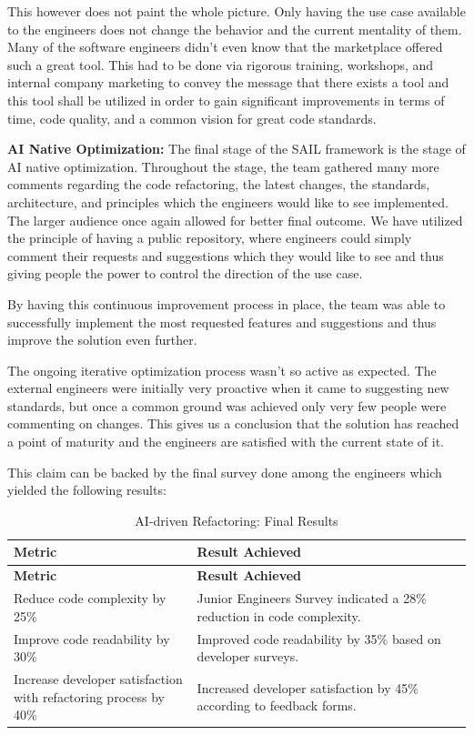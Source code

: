 \documentclass[]{imc-inf}
\begin{document}
This however does not paint the whole picture. Only having the use case available to the engineers does not change the behavior and the current mentality of them. Many of the software engineers didn't even know that the marketplace offered such a great tool. This had to be done via rigorous training, workshops, and internal company marketing to convey the message that there exists a tool and this tool shall be utilized in order to gain significant improvements in terms of time, code quality, and a common vision for great code standards. 


\textbf{AI Native Optimization:}
The final stage of the SAIL framework is the stage of AI native optimization. Throughout the stage, the team gathered many more comments regarding the code refactoring, the latest changes, the standards, architecture, and principles which the engineers would like to see implemented. The larger audience once again allowed for better final outcome. We have utilized the principle of having a public repository, where engineers could simply comment their requests and suggestions which they would like to see and thus giving people the power to control the direction of the use case.

By having this continuous improvement process in place, the team was able to successfully implement the most requested features and suggestions and thus improve the solution even further.

The ongoing iterative optimization process wasn't so active as expected. The external engineers were initially very proactive when it came to suggesting new standards, but once a common ground was achieved only very few people were commenting on changes. 
This gives us a conclusion that  the solution has reached a point of maturity and the engineers are satisfied with the current state of it.

This claim can be backed by the final survey done among the engineers which yielded the following results:
\begin{longtable}{|p{0.4\linewidth}|p{0.6\linewidth}|}
	\hline
	\textbf{Metric} & \textbf{Result Achieved} \\
	\hline
	\endfirsthead
	\hline
	\textbf{Metric} & \textbf{Result Achieved} \\
	\hline
	\endhead
	\hline
	\caption{AI-driven Refactoring: Final Results}
	\label{tab:refactor_final_results}
	\endlastfoot
	
	Reduce code complexity by 25\% &
	Junior Engineers Survey indicated a 28\% reduction in code complexity. \\
	\hline
	
	Improve code readability by 30\% &
	Improved code readability by 35\% based on developer surveys.\\
	\hline
	
	Increase developer satisfaction with refactoring process by 40\% &
	Increased developer satisfaction by 45\% according to feedback forms. \\
	\hline
\end{longtable}
\end{document}
